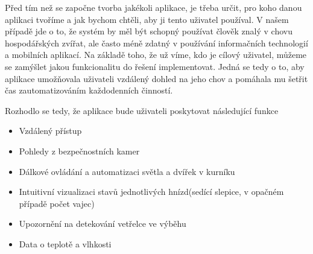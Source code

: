 Před tím než se započne tvorba jakékoli aplikace, je třeba určit, pro koho danou aplikaci tvoříme a jak bychom chtěli, aby ji tento uživatel používal.
V našem případě jde o to, že systém by měl být schopný používat člověk znalý v chovu hospodářských zvířat, ale často méně zdatný v používání informačních technologií a mobilních aplikací.
Na základě toho, že už víme, kdo je cílový uživatel, můžeme se zamýšlet jakou funkcionalitu do řešení implementovat.
Jedná se tedy o to, aby aplikace umožňovala uživateli vzdálený dohled na jeho chov a pomáhala mu šetřit čas zautomatizováním každodenních činností.

Rozhodlo se tedy, že aplikace bude uživateli poskytovat následující funkce
\begin{itemize}
    \item Vzdálený přístup
    \item Pohledy z bezpečnostních kamer
    \item Dálkové ovládání a automatizaci světla a dvířek v kurníku
    \item Intuitivní vizualizaci stavů jednotlivých hnízd(sedící slepice, v opačném případě počet vajec)
    \item Upozornění na detekování vetřelce ve výběhu
    \item Data o teplotě a vlhkosti
\end{itemize}


\newpage